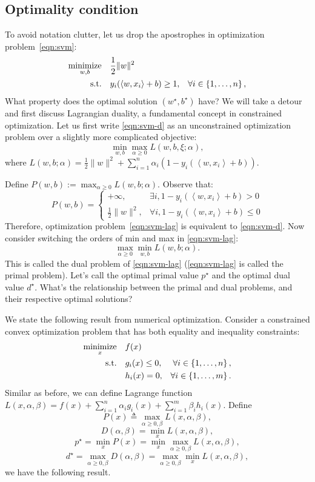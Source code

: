 \documentclass{article}
\DeclareMathOperator*{\minimize}{{\rm minimize}}
\DeclareMathOperator*{\st}{{\rm s.t.}}
\newcommand{\defeq}{\triangleq}
\newcommand{\inner}[2]{\left\langle #1,#2 \right\rangle}
\begin{document}
\subsection{Optimality condition}
To avoid notation clutter, let us drop the apostrophes in optimization problem~\eqref{eqn:svm}:
\begin{align}
  \minimize_{w,b} \quad & \frac12 \| w \|^2 & \label{eqn:svm-d} \\
    \st \quad &  y_i(\inner{w}{x_i} + b) \geq 1, &\forall i \in \cbr{1,\ldots,n}, \nonumber
\end{align}
What property does the optimal solution $(w^\star, b^\star)$ have? We will take a detour and first discuss Lagrangian duality, a fundamental concept in constrained optimization. Let us first write \eqref{eqn:svm-d} as an unconstrained optimization problem over a slightly more complicated objective:
\begin{equation}
   \min_{w,b} \max_{\alpha \geq 0} L(w,b,\xi;\alpha),
   \label{eqn:svm-lag}
\end{equation}
where $L(w,b;\alpha) = \frac 1 2 \| w \|^2 + \sum_{i=1}^n \alpha_i (1 - y_i(\inner{w}{x_i} + b))$.

Define $P(w,b) := \max_{\alpha \geq 0} L(w,b;\alpha)$. Observe that:
\[
P(w,b) =
\begin{cases}
+\infty, & \exists i, 1 - y_i(\inner{w}{x_i} + b) > 0 \\
\frac 1 2 \| w \|^2, & \forall i, 1 - y_i(\inner{w}{x_i} + b) \leq 0
\end{cases}
\]
Therefore, optimization problem~\eqref{eqn:svm-lag} is equivalent to \eqref{eqn:svm-d}. Now consider switching the orders of min and max in \eqref{eqn:svm-lag}:
\[ \max_{\alpha \geq 0} \min_{w,b} L(w,b;\alpha). \]
This is called the dual problem of \eqref{eqn:svm-lag} (\eqref{eqn:svm-lag} is called the primal problem). Let's call the optimal primal value $p^\star$ and the optimal dual value $d^\star$. What's the relationship between the primal and dual problems, and their respective optimal solutions?

We state the following result from numerical optimization. Consider a constrained convex optimization problem that has both equality and inequality constraints:
\begin{align}
  \minimize_{x} \quad & f(x) & \nonumber \\
    \st \quad & g_i(x) \leq 0, &\forall i \in \cbr{1,\ldots,n}, \nonumber \\
              & h_i(x) = 0, &\forall i \in \cbr{1,\ldots,m}. \nonumber
\end{align}
Similar as before, we can define Lagrange function $L(x,\alpha,\beta) = f(x) + \sum_{i=1}^n \alpha_i g_i(x) + \sum_{i=1}^m \beta_i h_i(x)$. Define
\[ P(x) \defeq \max_{\alpha \geq 0, \beta} L(x,\alpha,\beta), \]
\[ D(\alpha, \beta) = \min_x L(x,\alpha,\beta), \]
\[ p^\star = \min_x P(x) = \min_x \max_{\alpha \geq 0, \beta} L(x,\alpha,\beta),\]
\[ d^\star = \max_{\alpha \geq 0, \beta} D(\alpha, \beta) = \max_{\alpha \geq 0, \beta} \min_x L(x,\alpha,\beta),\]
we have the following result.
\end{document}
